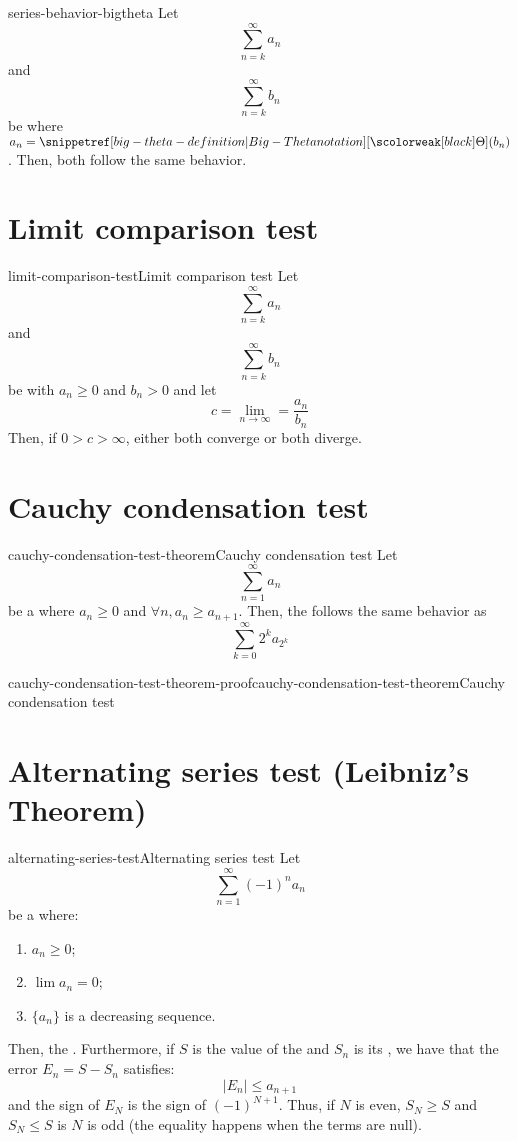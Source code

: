 \documentclass[preview]{standalone}
\begin{document}
\begin{snippetcorollary}{series-behavior-bigtheta}{}
    Let \[\sum_{n=k}^\infty a_n\] and \[\sum_{n=k}^\infty b_n\]
    be \series where \(a_n = \bigtheta(b_n)\). Then, both \series follow the same behavior.
\end{snippetcorollary}

\section{Limit comparison test}

\begin{snippettheorem}{limit-comparison-test}{Limit comparison test}
    Let \[
        \sum_{n=k}^\infty a_n
    \]
    and \[
        \sum_{n=k}^\infty b_n
    \]
    be \series with \(a_n \geq 0\) and \(b_n > 0\) and let
    \[ c = \lim_{n \to \infty} = \frac{a_n}{b_n} \]
    Then, if \(0 > c > \infty\), either both \series converge or both \series diverge.
\end{snippettheorem}

\section{Cauchy condensation test}

\begin{snippettheorem}{cauchy-condensation-test-theorem}{Cauchy condensation test}
    Let
    \[
        \sum_{n=1}^\infty a_n
    \]
    be a \series where \(a_n \geq 0\) and \(\forall n, a_n \geq a_{n+1}\).
    Then, the \series follows the same behavior as
    \[
        \sum_{k=0}^\infty 2^k a_{2^k}
    \]
\end{snippettheorem}

\begin{snippetproof}{cauchy-condensation-test-theorem-proof}{cauchy-condensation-test-theorem}{Cauchy condensation test}
    \todo
\end{snippetproof}

\section{Alternating series test (Leibniz's Theorem)}

\begin{snippettheorem}{alternating-series-test}{Alternating series test}
    Let \[\sum_{n=1}^\infty {(-1)}^n a_n\] be a \series
    where:
    \begin{enumerate}
        \item \(a_n \geq 0\);
        \item \(\lim a_n = 0\);
        \item \(\{a_n\}\) is a decreasing sequence.
    \end{enumerate}
    Then, the \series \seriesconverges.
    Furthermore, if \(S\) is the value of the \series and \(S_n\) is its \partialsum,
    we have that the error \(E_n = S-S_n\) satisfies:
    \[ |E_n| \leq a_{n+1} \]
    and the sign of \(E_N\) is the sign of \({(-1)}^{N+1}\). Thus, if \(N\) is even, \(S_N\geq S\) and
    \(S_N \leq S\) is \(N\) is odd (the equality happens when the terms are null).
\end{snippettheorem}
\end{document}

